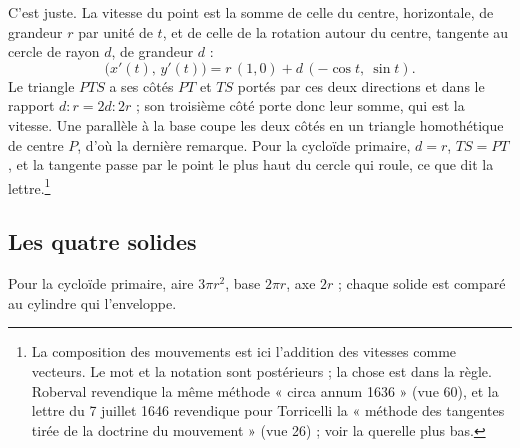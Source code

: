 \documentclass[11pt,a4paper]{article}
\begin{document}
C'est juste. La vitesse du point est la somme de celle du centre, horizontale, de
grandeur $r$ par unité de $t$, et de celle de la rotation autour du centre,
tangente au cercle de rayon $d$, de grandeur $d$ :
\[
\bigl(x'(t),\,y'(t)\bigr) = r\,(1,0) + d\,(-\cos t,\ \sin t).
\]
Le triangle $PTS$ a ses côtés $PT$ et $TS$ portés par ces deux directions et dans
le rapport $d : r = 2d : 2r$ ; son troisième côté porte donc leur somme, qui est
la vitesse. Une parallèle à la base coupe les deux côtés en un triangle
homothétique de centre $P$, d'où la dernière remarque. Pour la cycloïde
primaire, $d=r$, $TS=PT$, et la tangente passe par le point le plus haut du
cercle qui roule, ce que dit la lettre.\footnote{La composition des
mouvements est ici l'addition des vitesses comme vecteurs. Le mot et la
notation sont postérieurs ; la chose est dans la règle. Roberval revendique la
même méthode « circa annum 1636 » (vue 60), et la lettre du 7 juillet 1646
revendique pour Torricelli la « méthode des tangentes tirée de la doctrine du
mouvement » (vue 26) ; voir la querelle plus bas.}

\subsection*{Les quatre solides}

Pour la cycloïde primaire, aire $3\pi r^2$, base $2\pi r$, axe $2r$ ; chaque
solide est comparé au cylindre qui l'enveloppe.
\end{document}
